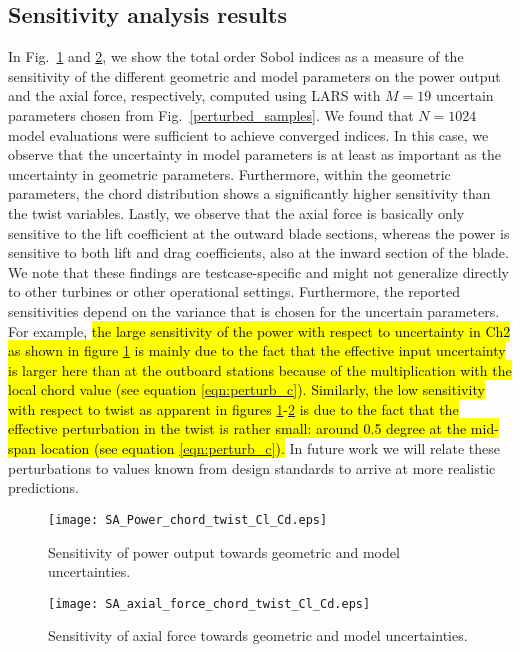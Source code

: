\subsection{Sensitivity analysis results}
In Fig.~\ref{fig:sensitivity_analysis_power} and \ref{fig:sensitivity_analysis_force}, we show the total order Sobol indices as a measure of the sensitivity of the different geometric and model parameters on the power output and the axial force, respectively, computed using LARS with $M=19$ uncertain parameters chosen from Fig.~\ref{perturbed_samples}. We found that $N=1024$ model evaluations were sufficient to achieve converged indices. In this case, we observe that the uncertainty in model parameters is at least as important as the uncertainty in geometric parameters. Furthermore, within the geometric parameters, the chord distribution shows a significantly higher sensitivity than the twist variables. Lastly, we observe that the axial force is basically only sensitive to the lift coefficient at the outward blade sections, whereas the power is sensitive to both lift and drag coefficients, also at the inward section of the blade. We note that these findings are testcase-specific and might not generalize directly to other turbines or other operational settings. Furthermore, the reported sensitivities depend on the variance that is chosen for the uncertain parameters. For example, \hl{the large sensitivity of the power with respect to uncertainty in Ch2 as shown in figure \ref{fig:sensitivity_analysis_power} is mainly due to the fact that the effective input uncertainty is larger here than at the outboard stations because of the multiplication with the local chord value (see equation \eqref{eqn:perturb_c}). Similarly, the low sensitivity with respect to twist as apparent in figures \ref{fig:sensitivity_analysis_power}-\ref{fig:sensitivity_analysis_force} is due to the fact that the effective perturbation in the twist is rather small: around 0.5 degree at the mid-span location (see equation \eqref{eqn:perturb_c}).} In future work we will relate these perturbations to values known from design standards to arrive at more realistic predictions.

\begin{figure}[h!]
\centering
\texttt{[image: SA\_Power\_chord\_twist\_Cl\_Cd.eps]}
\caption{Sensitivity of power output towards geometric and model uncertainties.}
\label{fig:sensitivity_analysis_power}
\end{figure}


\begin{figure}[h!]
\centering
\texttt{[image: SA\_axial\_force\_chord\_twist\_Cl\_Cd.eps]}
\caption{Sensitivity of axial force towards geometric and model uncertainties.}
\label{fig:sensitivity_analysis_force}
\end{figure}

